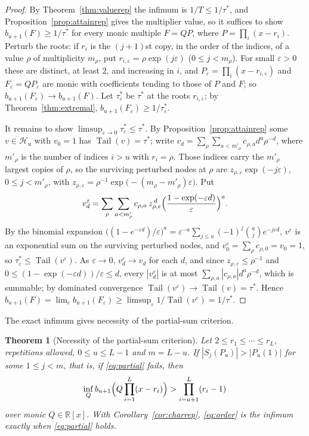 \documentclass[11pt]{article}
\newtheorem{theorem}{Theorem}[section]
\theoremstyle{definition}
\theoremstyle{plain}
\newcommand{\R}{\mathbb R}
\DeclareMathOperator{\Tail}{Tail}
\begin{document}
\begin{proof}
By Theorem~\ref{thm:valuerep} the infimum is $1/T\le1/\tau^*$, and
Proposition~\ref{prop:attainrep} gives the multiplier value, so it suffices
to show $b_{u+1}(F)\ge1/\tau^*$ for every monic multiple $F=QP$, where
$P=\prod_i(x-r_i)$.  Perturb the roots: if $r_i$ is the $(j+1)$st copy, in the
order of the indices, of a value $\rho$ of multiplicity $m_\rho$, put
$r_{i,\varepsilon}=\rho\exp(j\varepsilon)$ ($0\le j<m_\rho$).  For small
$\varepsilon>0$ these are distinct, at least $2$, and increasing in $i$, and
$P_\varepsilon=\prod_i(x-r_{i,\varepsilon})$ and $F_\varepsilon=QP_\varepsilon$
are monic with coefficients tending to those of $P$ and $F$; so
$b_{u+1}(F_\varepsilon)\to b_{u+1}(F)$.  Let $\tau^*_\varepsilon$ be $\tau^*$
at the roots $r_{i,\varepsilon}$; by Theorem~\ref{thm:extremal},
$b_{u+1}(F_\varepsilon)\ge1/\tau^*_\varepsilon$.

It remains to show $\limsup_{\varepsilon\to0}\tau^*_\varepsilon\le\tau^*$.  By
Proposition~\ref{prop:attainrep} some $v\in\mathcal H_u$ with $v_0=1$ has
$\Tail(v)=\tau^*$; write
$v_d=\sum_\rho\sum_{a<m'_\rho}c_{\rho,a}d^a\rho^{-d}$, where $m'_\rho$ is the
number of indices $i>u$ with $r_i=\rho$.  Those indices carry the $m'_\rho$
largest copies of $\rho$, so the surviving perturbed nodes at $\rho$ are
$z_{\rho,\varepsilon}\exp(-j\varepsilon)$, $0\le j<m'_\rho$, with
$z_{\rho,\varepsilon}=\rho^{-1}\exp\bigl(-(m_\rho-m'_\rho)\varepsilon\bigr)$.  Put
\[
  v^\varepsilon_d=\sum_\rho\sum_{a<m'_\rho}c_{\rho,a}\,
  z_{\rho,\varepsilon}^{\,d}\Bigl(\frac{1-\exp(-\varepsilon d)}{\varepsilon}\Bigr)^a .
\]
By the binomial expansion
$\bigl((1-e^{-\varepsilon d})/\varepsilon\bigr)^a
=\varepsilon^{-a}\sum_{j\le a}(-1)^j\binom aj e^{-j\varepsilon d}$,
$v^\varepsilon$ is an exponential sum on the surviving perturbed nodes, and
$v^\varepsilon_0=\sum_\rho c_{\rho,0}=v_0=1$, so
$\tau^*_\varepsilon\le\Tail(v^\varepsilon)$.  As $\varepsilon\to0$,
$v^\varepsilon_d\to v_d$ for each $d$, and since
$z_{\rho,\varepsilon}\le\rho^{-1}$ and
$0\le(1-\exp(-\varepsilon d))/\varepsilon\le d$, every $|v^\varepsilon_d|$ is
at most $\sum_{\rho,a}|c_{\rho,a}|d^a\rho^{-d}$, which is summable; by
dominated convergence $\Tail(v^\varepsilon)\to\Tail(v)=\tau^*$.  Hence
$b_{u+1}(F)=\lim_\varepsilon b_{u+1}(F_\varepsilon)
\ge\limsup_\varepsilon1/\Tail(v^\varepsilon)=1/\tau^*$.
\end{proof}

The exact infimum gives necessity of the partial-sum criterion.

\begin{theorem}[Necessity of the partial-sum criterion]\label{thm:converse}
Let $2\le r_1\le\cdots\le r_L$, repetitions allowed, $0\le u\le L-1$ and
$m=L-u$.  If $|S_j(P_u)|>|P_u(1)|$ for some $1\le j<m$, that is, if
\eqref{eq:partial} fails, then
\[
  \inf_Qb_{u+1}\Bigl(Q\prod_{i=1}^L(x-r_i)\Bigr)>\prod_{i=u+1}^L(r_i-1)
\]
over monic $Q\in\R[x]$.  With Corollary~\ref{cor:charrep},
\eqref{eq:order} is the infimum exactly when \eqref{eq:partial} holds.
\end{theorem}
\end{document}
